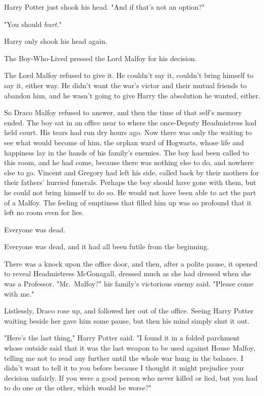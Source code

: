 Harry Potter just shook his head. "And if that's not an option?"

"You should \emph{hurt.}"

Harry only shook his head again.

The Boy-Who-Lived pressed the Lord Malfoy for his decision.

The Lord Malfoy refused to give it. He couldn't say it, couldn't bring himself
to say it, either way. He didn't want the war's victor and their mutual friends
to abandon him, and he wasn't going to give Harry the absolution he wanted,
either.

So Draco Malfoy refused to answer, and then the time of that self's memory
ended.
\sbreak
The boy sat in an office near to where the once-Deputy Headmistress had held
court. His tears had run dry hours ago. Now there was only the waiting to see
what would become of him, the orphan ward of Hogwarts, whose life and happiness
lay in the hands of his family's enemies. The boy had been called to this room,
and he had come, because there was nothing else to do, and nowhere else to go.
Vincent and Gregory had left his side, called back by their mothers for their
fathers' hurried funerals. Perhaps the boy should have gone with them, but he
could not bring himself to do so. He would not have been able to act the part
of a Malfoy. The feeling of emptiness that filled him up was so profound that
it left no room even for lies.

Everyone was dead.

Everyone was dead, and it had all been futile from the beginning.

There was a knock upon the office door, and then, after a polite pause, it
opened to reveal Headmistress McGonagall, dressed much as she had dressed when
she was a Professor. "Mr.~Malfoy?" his family's victorious enemy said. "Please
come with me."

Listlessly, Draco rose up, and followed her out of the office. Seeing Harry
Potter waiting beside her gave him some pause, but then his mind simply shut it
out.

"Here's the last thing," Harry Potter said. "I found it in a folded parchment
whose outside said that it was the last weapon to be used against House Malfoy,
telling me not to read any further until the whole war hung in the balance. I
didn't want to tell it to you before because I thought it might prejudice your
decision unfairly. If you were a good person who never killed or lied, but you
had to do one or the other, which would be worse?"


